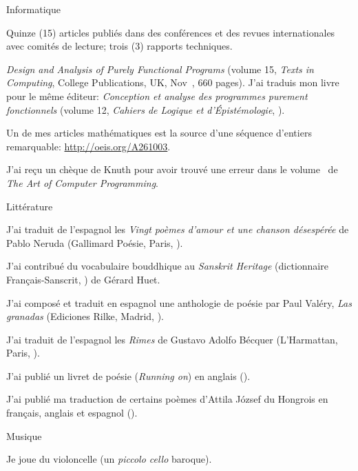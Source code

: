\documentclass[a4paper,11pt]{article}
\begin{document}
\bigskip
\noindent Informatique
\begin{itemize*}

  \item Quinze (15) articles publiés dans des conférences et des
    revues internationales avec comités de lecture; trois (3) rapports
    techniques.

  \item \textit{Design and Analysis of Purely Functional Programs}
    (volume 15, \emph{Texts in Computing}, College Publications, UK,
    Nov~, 660 pages). J'ai traduis mon livre pour
    le même éditeur: \textit{Conception et analyse des programmes
      purement fonctionnels} (volume 12, \emph{Cahiers de Logique et
    d'Épistémologie}, ).

  \item Un de mes articles mathématiques est la source d'une séquence
    d'entiers remarquable: \url{http://oeis.org/A261003}.

  \item J'ai reçu un chèque de Knuth pour avoir trouvé une erreur dans
    le volume~ de \emph{The Art of Computer
    Programming}.

\end{itemize*}

\noindent Littérature
\begin{itemize*}

  \item J'ai traduit de l'espagnol les \textit{Vingt poèmes
    d'amour et une chanson désespérée} de Pablo Neruda (Gallimard
    Poésie, Paris, ).

  \item J'ai contribué du vocabulaire bouddhique au \emph{Sanskrit
    Heritage} (dictionnaire Français-Sanscrit, ) de
    Gérard Huet. %

  \item J'ai composé et traduit en espagnol une anthologie de poésie
    par Paul Valéry, \emph{Las granadas} (Ediciones Rilke, Madrid,
    ).

  \item J'ai traduit de l'espagnol les \textit{Rimes} de Gustavo
    Adolfo B\'ecquer (L'Harmattan, Paris, ).

  \item J'ai publié un livret de poésie (\textit{Running on}) en
    anglais ().

  \item J'ai publié ma traduction de certains poèmes d'Attila József
    du Hongrois en français, anglais et espagnol
    ().

\end{itemize*}

\noindent Musique
\begin{itemize*}

  \item Je joue du violoncelle (un \emph{piccolo cello} baroque).

\end{itemize*}




\nocite{*}
\end{document}
